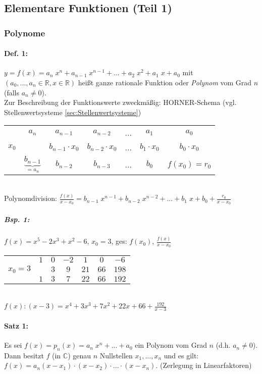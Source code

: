 \subsection{Elementare Funktionen (Teil 1)}
\subsubsection{Polynome}
\paragraph{Def. 1:} \parskp
$y=f(x)=a_n\; x^n+a_{n-1}\;x^{n-1}+...+a_2\; x^2+a_1\; x+a_0$ mit $(a_0, ..., a_n \in \mathbb{R}, x\in \mathbb{R})$ heißt ganze rationale Funktion oder \emph{Polynom} vom Grad $n$ (falls $a_n \not = 0$).\\
Zur Beschreibung der Funktionswerte zweckmäßig: HORNER-Schema (vgl. Stellenwertsysteme \ref{sec:Stellenwertsysteme})\\
\begin{tabular}{r | c c c c c c}
 & $a_n$ & $a_{n-1}$ & $ a_{n-2}$ & ... & $a_1$ & $a_0$\\
$x_0$ &  & $b_{n-1}\cdot x_0$ & $b_{n-2}\cdot x_0$ & ... & $b_1 \cdot x_0$ & $b_0\cdot x_0$ \\
\hline
 & $\underbrace{\boxed{b_{n-1}}}_{=a_n}$ & $\boxed{b_{n-2}}$ & $\boxed{b_{n-3}}$ & ... & $\boxed{b_0}$ & $f(x_0)=r_0$\\
\end{tabular}\\
Polynomdivision: $\frac{f(x)}{x-x_0}=b_{n-1}\;x^{n-1}+b_{n-2}\;x^{n-2}+...+b_1\; x + b_0 + \frac{r_0}{x-x_0}$

\subparagraph{Bsp. 1:} \parskp
$f(x)=x^5-2x^3+x^2-6$, \quad $x_0=3$, \quad ges: $f(x_0)$, \quad$\frac{f(x)}{x-x_0}$\\
\begin{tabular}{r| c c c c c c}
 & $1$ & $0$ & $-2$ & $1$ & $0$ & $-6$\\
$x_0=3$ &  & $3$ & $9$ & $21$ & $66$ & $198$ \\
\hline
 & $1$ & $3$ & $7$ & $22$ & $66$ & $192$\\
\end{tabular}\\
$f(x):(x-3)=x^4+3 x^3 + 7x^2+22x + 66 + \frac{192}{x-3}$

\paragraph{Satz 1:} \parskp
Es sei $f(x)=p_n(x) = a_n \; x^n + ... + a_0$ ein Polynom vom Grad $n$ (d.h. $a_n\not = 0$). Dann besitzt $f$ (in $\mathbb{C}$) genau $n$ Nullstellen $x_1,...,x_n$ und es gilt: $f(x) = a_n (x-x_1)\cdot (x-x_2)\cdot ... \cdot (x-x_n)$. (Zerlegung in Linearfaktoren)

